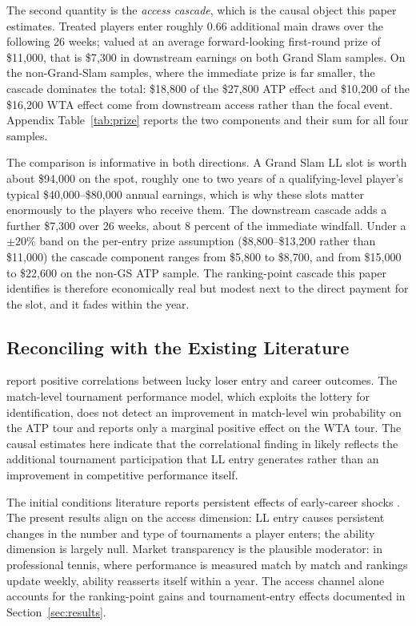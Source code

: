 The second quantity is the \textit{access cascade}, which is the causal object this paper estimates. Treated players enter roughly 0.66 additional main draws over the following 26 weeks; valued at an average forward-looking first-round prize of \$11{,}000, that is \$7{,}300 in downstream earnings on both Grand Slam samples. On the non-Grand-Slam samples, where the immediate prize is far smaller, the cascade dominates the total: \$18{,}800 of the \$27{,}800 ATP effect and \$10{,}200 of the \$16{,}200 WTA effect come from downstream access rather than the focal event. Appendix Table~\ref{tab:prize} reports the two components and their sum for all four samples.

The comparison is informative in both directions. A Grand Slam LL slot is worth about \$94{,}000 on the spot, roughly one to two years of a qualifying-level player's typical \$40{,}000--\$80{,}000 annual earnings, which is why these slots matter enormously to the players who receive them. The downstream cascade adds a further \$7{,}300 over 26 weeks, about 8 percent of the immediate windfall. Under a $\pm 20\%$ band on the per-entry prize assumption (\$8{,}800--\$13{,}200 rather than \$11{,}000) the cascade component ranges from \$5{,}800 to \$8{,}700, and from \$15{,}000 to \$22{,}600 on the non-GS ATP sample. The ranking-point cascade this paper identifies is therefore economically real but modest next to the direct payment for the slot, and it fades within the year.

\subsection{Reconciling with the Existing Literature}
\label{sec:mechanisms_reconciling}

\citet{Maity2025_early_career_sports} report positive correlations between lucky loser entry and career outcomes. The match-level tournament performance model, which exploits the lottery for identification, does not detect an improvement in match-level win probability on the ATP tour and reports only a marginal positive effect on the WTA tour. The causal estimates here indicate that the correlational finding in \citet{Maity2025_early_career_sports} likely reflects the additional tournament participation that LL entry generates rather than an improvement in competitive performance itself.

The initial conditions literature reports persistent effects of early-career shocks \citep{Oyer2006_initial_placement, Oreopoulos2012_graduating_recession}. The present results align on the access dimension: LL entry causes persistent changes in the number and type of tournaments a player enters; the ability dimension is largely null. Market transparency is the plausible moderator: in professional tennis, where performance is measured match by match and rankings update weekly, ability reasserts itself within a year. The access channel alone accounts for the ranking-point gains and tournament-entry effects documented in Section~\ref{sec:results}.
